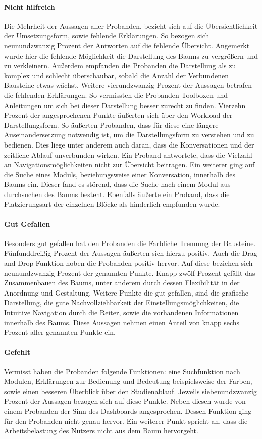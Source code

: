 \paragraph{Nicht hilfreich}Die Mehrheit der Aussagen aller Probanden, bezieht sich auf die Übersichtlichkeit der Umsetzungsform, sowie fehlende Erklärungen. So bezogen sich neunundzwanzig Prozent der Antworten auf die fehlende Übersicht. Angemerkt wurde hier die fehlende Möglichkeit die Darstellung des Baums zu vergrößern und zu verkleinern. Außerdem empfanden die Probanden die Darstellung als zu komplex und schlecht überschaubar, sobald die Anzahl der Verbundenen Bausteine etwas wächst. Weitere vierundzwanzig Prozent der Aussagen betrafen die fehlenden Erklärungen. So vermissten die Probanden Toolboxen und Anleitungen um sich bei dieser Darstellung besser zurecht zu finden. Vierzehn Prozent der angesprochenen Punkte äußerten sich über den Workload der Darstellungsform. So äußerten Probanden, dass für diese eine längere Auseinandersetzung notwendig ist, um die Darstellungsform zu verstehen und zu bedienen. Dies liege unter anderem auch daran, dass die Konversationen und der zeitliche Ablauf unverbunden wirken. Ein Proband antwortete, dass die Vielzahl an Navigationsmöglichkeiten nicht zur Übersicht beitragen. Ein weiterer ging auf die Suche eines Moduls, beziehungsweise einer Konversation, innerhalb des Baums ein. Dieser fand es störend, dass die Suche nach einem Modul aus durchsuchen des Baums besteht. Ebenfalls äußerte ein Proband, dass die Platzierungsart der einzelnen Blöcke als hinderlich empfunden wurde.

\paragraph{Gut Gefallen}Besonders gut gefallen hat den Probanden die Farbliche Trennung der Bausteine.  Fünfunddreißig Prozent der Aussagen äußerten sich hierzu positiv. Auch die Drag and Drop-Funktion hoben die Probanden positiv hervor. Auf diese beziehen sich neunundzwanzig Prozent der genannten Punkte. Knapp zwölf Prozent gefällt das Zusammenbauen des Baums, unter anderem durch dessen Flexibilität in der Anordnung und Gestaltung. Weitere Punkte die gut gefallen, sind die grafische Darstellung, die gute Nachvollziehbarkeit der Einstellungsmöglichkeiten, die Intuitive Navigation durch die Reiter, sowie die vorhandenen Informationen innerhalb des Baums. Diese Aussagen nehmen einen Anteil von knapp sechs Prozent aller genannten Punkte ein.

\paragraph{Gefehlt}Vermisst haben die Probanden folgende Funktionen: eine Suchfunktion nach Modulen, Erklärungen zur Bedienung und Bedeutung beispielsweise der Farben, sowie einen besseren Überblick über den Studienablauf. Jeweils siebenundzwanzig Prozent der Aussagen bezogen sich auf diese Punkte. Neben diesen wurde von einem Probanden der Sinn des Dashboards angesprochen. Dessen Funktion ging für den Probanden nicht genau hervor. Ein weiterer Punkt spricht an, dass die Arbeitsbelastung des Nutzers nicht aus dem Baum hervorgeht.



